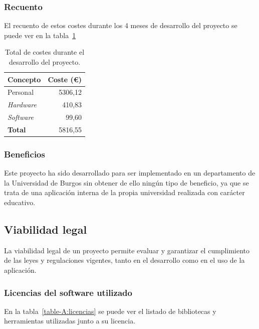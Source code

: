 \subsubsection{Recuento}
El recuento de estos costes durante los 4 meses de desarrollo del proyecto se puede ver en la tabla~\ref{table-A:economía}

\begin{table}
  \centering 
  \begin{tabular}{l r}
    \toprule
    \textbf{Concepto} & \textbf{Coste (€)} \\
    \midrule
    Personal & 5306,12 \\
	\textit{Hardware} & 410,83 \\
	\textit{Software} & 99,60\\
	\midrule
	\textbf{Total} & 5816,55 \\
	\bottomrule
  \end{tabular}
\caption{Total de costes durante el desarrollo del proyecto.}\label{table-A:economía}
\end{table}


\subsubsection{Beneficios}
Este proyecto ha sido desarrollado para ser implementado en un departamento de la Universidad de Burgos sin obtener de ello ningún tipo de beneficio, ya que se trata de una aplicación interna de la propia universidad realizada con carácter educativo.

\subsection{Viabilidad legal}
La viabilidad legal de un proyecto permite evaluar y garantizar el cumplimiento de las leyes y regulaciones vigentes, tanto en el desarrollo como en el uso de la aplicación.

\subsubsection{Licencias del software utilizado}

En la tabla~\ref{table-A:licencias} se puede ver el listado de bibliotecas y herramientas utilizadas junto a su licencia.

